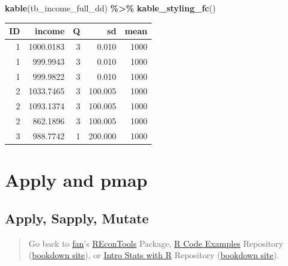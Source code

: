 \documentclass[
]{book}
\newenvironment{Shaded}{\begin{snugshade}}{\end{snugshade}}
\newcommand{\KeywordTok}[1]{\textcolor[rgb]{0.13,0.29,0.53}{\textbf{#1}}}
\newcommand{\NormalTok}[1]{#1}
\newcommand{\OperatorTok}[1]{\textcolor[rgb]{0.81,0.36,0.00}{\textbf{#1}}}
\newcommand{\StringTok}[1]{\textcolor[rgb]{0.31,0.60,0.02}{#1}}
\begin{document}
\begin{Shaded}
\begin{Highlighting}[]
\KeywordTok{kable}\NormalTok{(tb\_income\_full\_dd) }\OperatorTok{\%\textgreater{}\%}
\StringTok{  }\KeywordTok{kable\_styling\_fc}\NormalTok{()}
\end{Highlighting}
\end{Shaded}

\begin{table}[!h]
\centering
\begin{tabular}{r|r|r|r|r}
\hline
ID & income & Q & sd & mean\\
\hline
\rowcolor{gray!6}  1 & 1000.0183 & 3 & 0.010 & 1000\\
\hline
1 & 999.9943 & 3 & 0.010 & 1000\\
\hline
\rowcolor{gray!6}  1 & 999.9822 & 3 & 0.010 & 1000\\
\hline
2 & 1033.7465 & 3 & 100.005 & 1000\\
\hline
\rowcolor{gray!6}  2 & 1093.1374 & 3 & 100.005 & 1000\\
\hline
2 & 862.1896 & 3 & 100.005 & 1000\\
\hline
\rowcolor{gray!6}  3 & 988.7742 & 1 & 200.000 & 1000\\
\hline
\end{tabular}
\end{table}

\hypertarget{apply-and-pmap}{%
\section{Apply and pmap}\label{apply-and-pmap}}

\hypertarget{apply-sapply-mutate}{%
\subsection{Apply, Sapply, Mutate}\label{apply-sapply-mutate}}

\begin{quote}
Go back to \href{http://fanwangecon.github.io/}{fan}'s \href{https://fanwangecon.github.io/REconTools/}{REconTools} Package, \href{https://fanwangecon.github.io/R4Econ/}{R Code Examples} Repository (\href{https://fanwangecon.github.io/R4Econ/bookdown}{bookdown site}), or \href{https://fanwangecon.github.io/Stat4Econ/}{Intro Stats with R} Repository (\href{https://fanwangecon.github.io/Stat4Econ/bookdown}{bookdown site}).
\end{quote}
\end{document}
